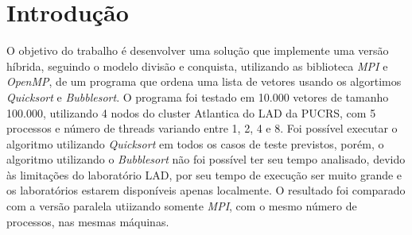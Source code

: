 \section{Introdução}

O objetivo do trabalho é desenvolver uma solução que implemente uma versão híbrida, seguindo o modelo divisão e conquista, utilizando as biblioteca \emph{MPI} e \emph{OpenMP}, de um programa que ordena uma lista de vetores usando os algortimos \emph{Quicksort} e \emph{Bubblesort}. O programa foi testado em 10.000 vetores de tamanho 100.000, utilizando 4 nodos do cluster Atlantica do LAD da PUCRS, com 5 processos e número de threads variando entre 1, 2, 4 e 8. Foi possível executar o algoritmo utilizando \emph{Quicksort} em todos os casos de teste previstos, porém, o algoritmo utilizando o \emph{Bubblesort} não foi possível ter seu tempo analisado, devido às limitações do laboratório LAD, por seu tempo de execução ser muito grande e os laboratórios estarem disponíveis apenas localmente. O resultado foi comparado com a versão paralela utiizando somente \emph{MPI}, com o mesmo número de processos, nas mesmas máquinas.
